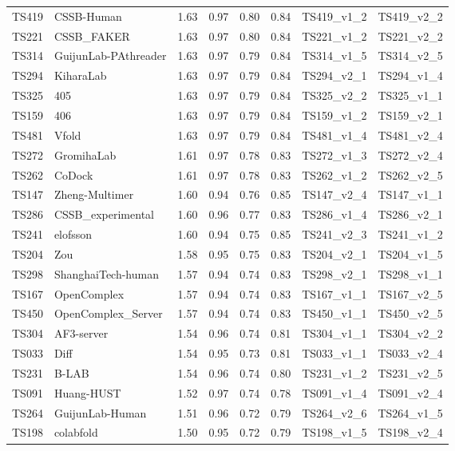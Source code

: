 \begin{longtable}{llllllll}
TS419 & CSSB-Human & 1.63 & 0.97 & 0.80 & 0.84 & TS419\_v1\_2 & TS419\_v2\_2 \\ 
TS221 & CSSB\_FAKER & 1.63 & 0.97 & 0.80 & 0.84 & TS221\_v1\_2 & TS221\_v2\_2 \\ 
TS314 & GuijunLab-PAthreader & 1.63 & 0.97 & 0.79 & 0.84 & TS314\_v1\_5 & TS314\_v2\_5 \\ 
TS294 & KiharaLab & 1.63 & 0.97 & 0.79 & 0.84 & TS294\_v2\_1 & TS294\_v1\_4 \\ 
TS325 & 405 & 1.63 & 0.97 & 0.79 & 0.84 & TS325\_v2\_2 & TS325\_v1\_1 \\ 
TS159 & 406 & 1.63 & 0.97 & 0.79 & 0.84 & TS159\_v1\_2 & TS159\_v2\_1 \\ 
TS481 & Vfold & 1.63 & 0.97 & 0.79 & 0.84 & TS481\_v1\_4 & TS481\_v2\_4 \\ 
TS272 & GromihaLab & 1.61 & 0.97 & 0.78 & 0.83 & TS272\_v1\_3 & TS272\_v2\_4 \\ 
TS262 & CoDock & 1.61 & 0.97 & 0.78 & 0.83 & TS262\_v1\_2 & TS262\_v2\_5 \\ 
TS147 & Zheng-Multimer & 1.60 & 0.94 & 0.76 & 0.85 & TS147\_v2\_4 & TS147\_v1\_1 \\ 
TS286 & CSSB\_experimental & 1.60 & 0.96 & 0.77 & 0.83 & TS286\_v1\_4 & TS286\_v2\_1 \\ 
TS241 & elofsson & 1.60 & 0.94 & 0.75 & 0.85 & TS241\_v2\_3 & TS241\_v1\_2 \\ 
TS204 & Zou & 1.58 & 0.95 & 0.75 & 0.83 & TS204\_v2\_1 & TS204\_v1\_5 \\ 
TS298 & ShanghaiTech-human & 1.57 & 0.94 & 0.74 & 0.83 & TS298\_v2\_1 & TS298\_v1\_1 \\ 
TS167 & OpenComplex & 1.57 & 0.94 & 0.74 & 0.83 & TS167\_v1\_1 & TS167\_v2\_5 \\ 
TS450 & OpenComplex\_Server & 1.57 & 0.94 & 0.74 & 0.83 & TS450\_v1\_1 & TS450\_v2\_5 \\ 
TS304 & AF3-server & 1.54 & 0.96 & 0.74 & 0.81 & TS304\_v1\_1 & TS304\_v2\_2 \\ 
TS033 & Diff & 1.54 & 0.95 & 0.73 & 0.81 & TS033\_v1\_1 & TS033\_v2\_4 \\ 
TS231 & B-LAB & 1.54 & 0.96 & 0.74 & 0.80 & TS231\_v1\_2 & TS231\_v2\_5 \\ 
TS091 & Huang-HUST & 1.52 & 0.97 & 0.74 & 0.78 & TS091\_v1\_4 & TS091\_v2\_4 \\ 
TS264 & GuijunLab-Human & 1.51 & 0.96 & 0.72 & 0.79 & TS264\_v2\_6 & TS264\_v1\_5 \\ 
TS198 & colabfold & 1.50 & 0.95 & 0.72 & 0.79 & TS198\_v1\_5 & TS198\_v2\_4 \\ 

\end{longtable}
